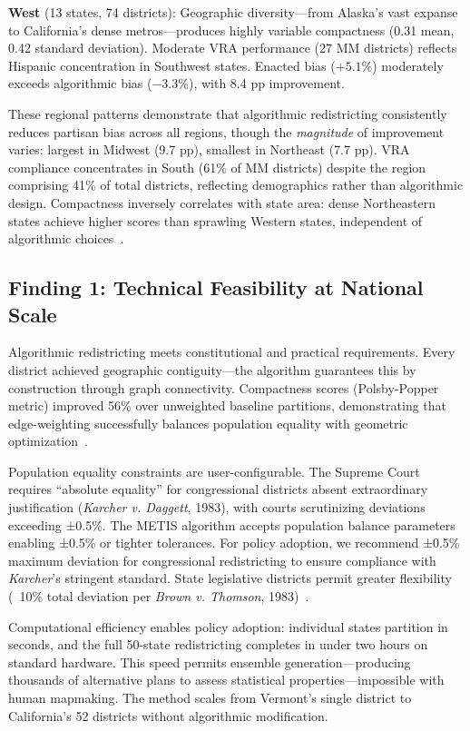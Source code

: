 \textbf{West} (13 states, 74 districts): Geographic diversity---from Alaska's vast expanse to California's dense metros---produces highly variable compactness (0.31 mean, 0.42 standard deviation). Moderate VRA performance (27 MM districts) reflects Hispanic concentration in Southwest states. Enacted bias ($+5.1\%$) moderately exceeds algorithmic bias ($-3.3\%$), with 8.4 pp improvement.

These regional patterns demonstrate that algorithmic redistricting consistently reduces partisan bias across all regions, though the \emph{magnitude} of improvement varies: largest in Midwest (9.7 pp), smallest in Northeast (7.7 pp). VRA compliance concentrates in South (61\% of MM districts) despite the region comprising 41\% of total districts, reflecting demographics rather than algorithmic design. Compactness inversely correlates with state area: dense Northeastern states achieve higher scores than sprawling Western states, independent of algorithmic choices~\cite{deluca2026compactness}.

\subsection{Finding 1: Technical Feasibility at National Scale}

Algorithmic redistricting meets constitutional and practical requirements. Every district achieved geographic contiguity---the algorithm guarantees this by construction through graph connectivity. Compactness scores (Polsby-Popper metric) improved 56\% over unweighted baseline partitions, demonstrating that edge-weighting successfully balances population equality with geometric optimization~\cite{deluca2026edgeweighted}.

Population equality constraints are user-configurable. The Supreme Court requires ``absolute equality'' for congressional districts absent extraordinary justification (\emph{Karcher v. Daggett}, 1983), with courts scrutinizing deviations exceeding ±0.5\%. The METIS algorithm accepts population balance parameters enabling ±0.5\% or tighter tolerances. For policy adoption, we recommend ±0.5\% maximum deviation for congressional redistricting to ensure compliance with \emph{Karcher}'s stringent standard. State legislative districts permit greater flexibility (~10\% total deviation per \emph{Brown v. Thomson}, 1983)~\cite{deluca2026recursive}.

Computational efficiency enables policy adoption: individual states partition in seconds, and the full 50-state redistricting completes in under two hours on standard hardware. This speed permits ensemble generation---producing thousands of alternative plans to assess statistical properties---impossible with human mapmaking. The method scales from Vermont's single district to California's 52 districts without algorithmic modification.

